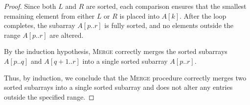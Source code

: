\documentclass[12pt]{article}
\begin{document}
\begin{itemize}
\begin{proof}
Since both $L$ and $R$ are sorted, each comparison ensures that the smallest remaining element from either $L$ or $R$ is placed into $A[k]$. After the loop completes, the subarray $A[p..r]$ is fully sorted, and no elements outside the range $A[p..r]$ are altered.

By the induction hypothesis, \textsc{Merge} correctly merges the sorted subarrays $A[p..q]$ and $A[q+1..r]$ into a single sorted subarray $A[p..r]$.

Thus, by induction, we conclude that the \textsc{Merge} procedure correctly merges two sorted subarrays into a single sorted subarray and does not alter any entries outside the specified range.
\end{proof}
\end{itemize}
\end{document}

